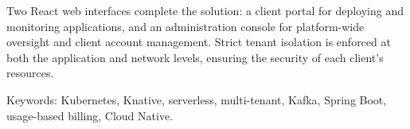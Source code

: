 \begin{flushleft}
Two React web interfaces complete the solution: a client portal for deploying and monitoring applications, and an administration console for platform-wide oversight and client account management. Strict tenant isolation is enforced at both the application and network levels, ensuring the security of each client's resources.

Keywords: Kubernetes, Knative, serverless, multi-tenant, Kafka, Spring Boot, usage-based billing, Cloud Native.

\end{flushleft}



